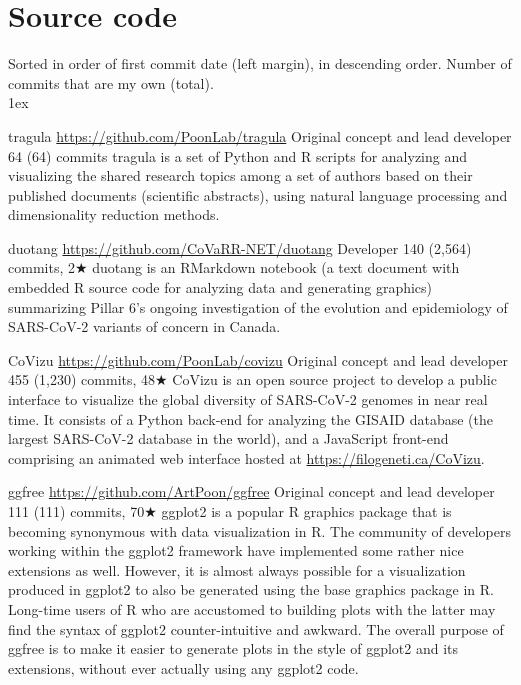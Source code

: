 
\section{Source code}

Sorted in order of first commit date (left margin), in descending order.
Number of commits that are my own (total).\\

\parskip 1ex


{tragula}
{\url{https://github.com/PoonLab/tragula}}
{Original concept and lead developer}
{64 (64) commits}
{tragula is a set of Python and R scripts for analyzing and visualizing the shared research topics among a set of authors based on their published documents (scientific abstracts), using natural language processing and dimensionality reduction methods.}


{duotang}
{\url{https://github.com/CoVaRR-NET/duotang}}
{Developer}
{140 (2,564) commits, 2$\bigstar$}
{duotang is an RMarkdown notebook (a text document with embedded R source code for analyzing data and generating graphics) summarizing Pillar 6's ongoing investigation of the evolution and epidemiology of SARS-CoV-2 variants of concern in Canada.}



{CoVizu}
{\url{https://github.com/PoonLab/covizu}}
{Original concept and lead developer}
{455 (1,230) commits, 48$\bigstar$}
{CoVizu is an open source project to develop a public interface to visualize the global diversity of SARS-CoV-2 genomes in near real time.
It consists of a Python back-end for analyzing the GISAID database (the largest SARS-CoV-2 database in the world), and a JavaScript front-end comprising an animated web interface hosted at \url{https://filogeneti.ca/CoVizu}.}


{ggfree}
{\url{https://github.com/ArtPoon/ggfree}}
{Original concept and lead developer}
{111 (111) commits, 70$\bigstar$}
{ggplot2 is a popular R graphics package that is becoming synonymous with data visualization in R. The community of developers working within the ggplot2 framework have implemented some rather nice extensions as well. However, it is almost always possible for a visualization produced in ggplot2 to also be generated using the base graphics package in R. Long-time users of R who are accustomed to building plots with the latter may find the syntax of ggplot2 counter-intuitive and awkward. The overall purpose of ggfree is to make it easier to generate plots in the style of ggplot2 and its extensions, without ever actually using any ggplot2 code.}


